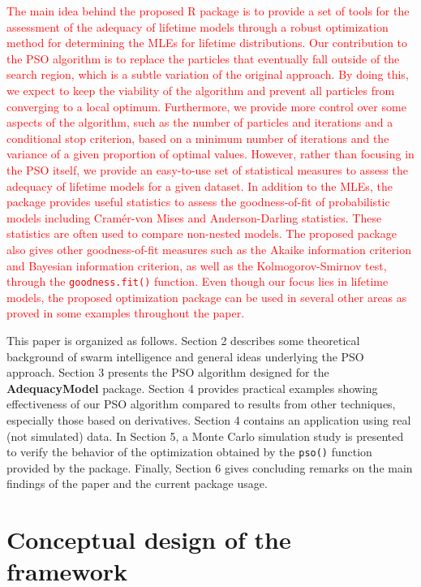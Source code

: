 \documentclass[10pt,letterpaper]{article}
\begin{document}
\textcolor{red}{The main idea behind the proposed \textsc{R} package is to provide a set of tools for the assessment of the adequacy of
lifetime models through a robust optimization method for determining the MLEs for lifetime distributions.
Our contribution to the PSO algorithm is to replace the particles that eventually fall outside of the search region, which is a subtle variation of the original approach.
By doing this, we expect to keep the viability of the algorithm and prevent all particles from converging to a local optimum.
Furthermore, we provide more control over some aspects of the algorithm, such as the number of particles and iterations and a conditional stop criterion,
based on a minimum number of iterations and the variance of a given proportion of optimal values.
However, rather than focusing in the PSO itself, we provide an easy-to-use set of statistical measures to assess
the adequacy of lifetime models for a given dataset.
In addition to the MLEs, the package provides  useful statistics to assess the goodness-of-fit of probabilistic models
including Cramér-von Mises and Anderson-Darling statistics.
These statistics are often used to compare non-nested models.
The proposed package also gives other goodness-of-fit measures such as the Akaike information criterion and Bayesian information criterion, as well as the Kolmogorov-Smirnov test, through the \texttt{goodness.fit()} function.
Even  though our focus lies in lifetime models, the proposed optimization package can be used in several other areas as proved in some examples throughout the paper.}


This paper is organized as follows.
Section 2 describes some theoretical background of swarm intelligence
and general ideas underlying the PSO approach.
Section 3 presents the PSO algorithm designed for the \textbf{AdequacyModel} package.
Section 4 provides practical examples  showing  effectiveness of our PSO algorithm compared to results from other techniques, especially those based on derivatives.
Section 4 contains an application using real (not simulated) data.
In Section 5, a Monte Carlo simulation study is presented to verify the behavior of the optimization obtained by the \texttt{pso()} function provided by the package.
Finally, Section 6 gives concluding remarks on the main findings of the paper and the current package usage.



\section{Conceptual design of the framework}
\label{pso}
\end{document}
